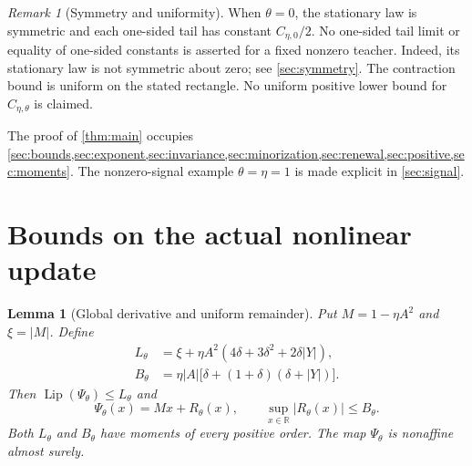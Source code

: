 \documentclass[11pt,a4paper]{article}
\numberwithin{equation}{section}
\newtheorem{lemma}[theorem]{Lemma}
\theoremstyle{remark}
\newtheorem{remark}[theorem]{Remark}
\DeclareMathOperator{\Lip}{Lip}
\newcommand{\R}{\mathbb R}
\begin{document}
\begin{remark}[Symmetry and uniformity]\label{rem:symmetry}
When $\theta=0$, the stationary law is symmetric and each one-sided tail
has constant $C_{\eta,0}/2$. No one-sided tail limit or equality of one-sided
constants is asserted for a fixed nonzero teacher. Indeed, its stationary
law is not symmetric about zero; see \cref{sec:symmetry}. The contraction
bound is uniform on the stated rectangle. No uniform positive lower bound
for $C_{\eta,\theta}$ is claimed.
\end{remark}

The proof of \cref{thm:main} occupies \cref{sec:bounds,sec:exponent,sec:invariance,sec:minorization,sec:renewal,sec:positive,sec:moments}.
The nonzero-signal example $\theta=\eta=1$ is made explicit in
\cref{sec:signal}.

\section{Bounds on the actual nonlinear update}\label{sec:bounds}

\begin{lemma}[Global derivative and uniform remainder]\label{lem:bounds}
Put $M=1-\eta A^2$ and $\xi=|M|$. Define
\begin{align}
 L_\theta&=\xi+\eta A^2(4\delta+3\delta^2+2\delta|Y|),
 \label{eq:L}\\
 B_\theta&=\eta|A|\bigl[\delta+(1+\delta)(\delta+|Y|)\bigr].
 \label{eq:B}
\end{align}
Then $\Lip(\Psi_\theta)\le L_\theta$ and
\begin{equation}
 \Psi_\theta(x)=Mx+R_\theta(x),\qquad
 \sup_{x\in\R}|R_\theta(x)|\le B_\theta.\label{eq:remainder}
\end{equation}
Both $L_\theta$ and $B_\theta$ have moments of every positive order. The
map $\Psi_\theta$ is nonaffine almost surely.
\end{lemma}
\end{document}

